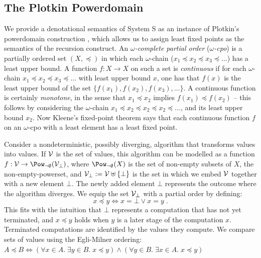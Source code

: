 \subsection{The Plotkin Powerdomain}
\label{chap4:subsec:plotkin}
We provide a denotational semantics of System S as an instance of Plotkin's powerdomain construction
\citep{plotkin:powerdomain}, which allows us to assign least fixed points as the semantics of the
recursion construct. An \emph{$\omega$-complete partial order} (\emph{$\omega$-cpo}) is a partially
ordered set $(X,\preceq)$ in which each $\omega$-chain ($x_1 \preceq x_2 \preceq x_3 \preceq \dots$)
has a least upper bound. A function $f:X \rightarrow X$ on such a set is \emph{continuous} if for
each $\omega$-chain $x_1 \preceq x_2 \preceq x_3 \preceq \dots$ with least upper bound $x$, one has
that $f(x)$ is the least upper bound of the set $\{f(x_1),f(x_2),f(x_3),\dots\}$.
A continuous function is certainly \emph{monotone}, in the sense that $x_1 \preceq x_2$ implies
$f(x_1) \preceq f(x_2)$ -- this follows by considering the $\omega$-chain
$x_1 \preceq x_2 \preceq x_2 \preceq x_2 \preceq \dots$, and its least upper bound $x_2$.
Now Kleene's fixed-point theorem says that each continuous function $f$ on an $\omega$-cpo with a least
element has a least fixed point.

Consider a nondeterministic, possibly diverging, algorithm that transforms values into values.
If $\mathcal{V}$ is the set of values, this algorithm can be modelled as a function
$f:\V \rightarrow \Pow_{\neg \emptyset}(\V_\bot)$, where
$\Pow_{\neg \emptyset}(X)$ is the set of non-empty subsets of $X$, the non-empty-powerset, and
$\mathcal{V}_\bot:= \mathcal{V} \uplus \{\bot\}$ is the set in which we embed $\mathcal{V}$ together with a new element $\bot$. The newly added element $\bot$ represents
the outcome where the algorithm diverges.
We equip the set $\mathcal{V}_\bot$ with a partial order by defining:
\[x \preceq y \iff x = \bot \lor x = y\;.\]
This fits with the intuition that $\bot$ represents a computation that has not yet
terminated, and $x \preceq y$ holds when $y$ is a later stage of the computation $x$.\\

Terminated computations are identified by the values they compute. We compare
sets of values using the Egli-Milner ordering:\vspace{1ex}\\
\( A \preceq B 
\iff (\forall x \in A.\; \exists y \in B.\; x \preceq y) \land (\forall y \in
B.\; \exists x \in A.\; x \preceq y)\)\vspace{1ex}

